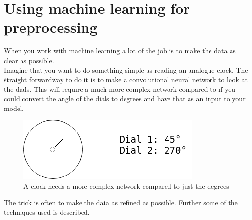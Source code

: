 \section{Using machine learning for preprocessing}
  When you work with machine learning a lot of the job is to make the data as clear as possible. \\
  Imagine that you want to do something simple as reading an analogue clock. The \"straight forward\" way to do it is to  
  make a convolutional neural network to look at the dials. This will require a much more complex network compared to if you could convert the angle of the dials
  to degrees and have that as an input to your model.

  \begin{figure}[ht]
    \centering
    \includegraphics[scale=0.5]{methods/figures/Clock.png}
    \caption{A clock needs a more complex network compared to just the degrees}
  \end{figure}
  The trick is often to make the data as refined as possible. Further some of the techniques used is described.
  
  
